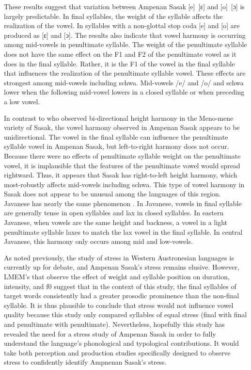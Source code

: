 \documentclass[12pt]{ouparticle}
\begin{document}
These results suggest that variation between Ampenan Sasak [e]~[ɛ] and [o]~[ɔ] is largely predictable. In final syllables, the weight of the syllable affects the realization of the vowel. In syllables with a non-glottal stop coda [e] and [o] are produced as [ɛ] and [ɔ]. The results also indicate that vowel harmony is occurring among mid-vowels in penultimate syllable. The weight of the penultimate syllable does not have the same effect on the F1 and F2 of the penultimate vowel as it does in the final syllable. Rather, it is the F1 of the vowel in the final syllable that influences the realization of the penultimate syllable vowel. These effects are strongest among mid-vowels including schwa. Mid-vowels /e/ and /o/ and schwa lower when the following mid-vowel lowers in a closed syllable or when preceding a low vowel. 

In contrast to \citet{chahal1998} who observed bi-directional height harmony in the Meno-mene variety of Sasak, the vowel harmony observed in Ampenan Sasak appears to be unidirectional. The vowel in the final syllable can influence the penultimate syllable vowel in Ampenan Sasak, but left-to-right harmony does not occur. Because there were no effects of penultimate syllable weight on the penultimate vowel, it is implausible that the features of the penultimate vowel would spread rightward.  Thus, it appears that Sasak has right-to-left height harmony, which most-robustly affects mid-vowels including schwa. This type of vowel harmony in Sasak does not appear to be unusual among the languages of this region. Javanese has nearly the same phenomenon \citep{adisasmito1999}. In Javanese, vowels in final syllable are generally tense in open syllables and lax in closed syllables. In eastern Javanese, when vowels are the same height and backness, a vowel in a light penultimate syllable laxes to match the lax vowel in the final syllable. In central Javanese, this harmony only occurs among mid and low-vowels.

As noted previously, the study of stress in Western Austronesian languages is currently up for debate, and Ampenan Sasak's stress remains elusive. However, LMEM's that observe the effect of weight and syllable position on duration, intensity, and f0 suggest that in the context of this study, the final syllables of target words consistently had a greater prosodic prominence than the non-final syllable. It is thus plausible to conclude that stress would not influence vowel quality because this study only compared syllables of equal stress (final with final and penultimate with penultimate). Nevertheless, hopefully this study has revealed the need for a stress study of Ampenan Sasak in order to fully understand the language's phonological and typological contributions. It would take both perception and production studies specifically designed to observe stress to confidently identify Ampnenan Sasak's stress.
\end{document}
